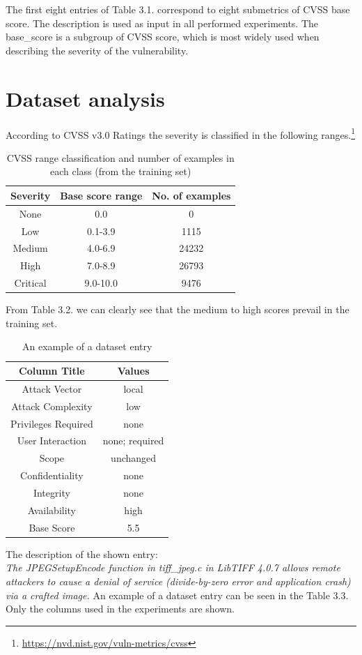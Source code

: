 \documentclass[times, utf8, zavrsni, english]{fer}
\begin{document}
\noindent The first eight entries of Table 3.1. correspond to eight submetrics of CVSS base score.
The description is used as input in all performed experiments.
The base\_score is a subgroup of CVSS score, which is most widely used when describing the severity of the vulnerability.

\section{Dataset analysis}
According to CVSS v3.0 Ratings the severity is classified in the following ranges.\footnote{\url{https://nvd.nist.gov/vuln-metrics/cvss}}
\begin{table}[h!]
	\centering
	\begin{tabular}{| c c c |} 
		\hline
		Severity & Base score range & No. of examples\\ [0.5ex] 
		\hline\hline
		
		None & 0.0 & 0  \\
		Low &  0.1-3.9 & 1115 \\
		Medium & 4.0-6.9 & 24232  \\
		High & 7.0-8.9  & 26793 \\
		Critical & 9.0-10.0 & 9476\\
		\hline
	\end{tabular}
	\caption{CVSS range classification and number of examples in each class (from the training set)}
	\label{table:2}
\end{table}

\noindent From Table 3.2. we can clearly see that the medium to high scores prevail in the training set.


\begin{table}[h!]
	\centering
	\begin{tabular}{| c | c |} 
		\hline
		Column Title & Values  \\ [0.5ex] 
		\hline\hline
		
		Attack Vector & local  \\
		Attack Complexity & low  \\
		Privileges Required & none  \\
		User Interaction & none; required \\ 
		Scope & unchanged \\ 
		Confidentiality & none  \\
		Integrity & none  \\
		Availability & high  \\
		
		\hline\hline
		
		Base Score & 5.5 \\
		\hline
	\end{tabular}
	\caption{An example of a dataset entry}
	\label{table:3}
\end{table}
\noindent The description of the shown entry: \\
\textit{The JPEGSetupEncode function in tiff\_jpeg.c in LibTIFF 4.0.7 allows remote attackers to cause a denial of service (divide-by-zero error and application crash) via a crafted image.}
An example of a dataset entry can be seen in the Table 3.3. Only the columns used in the experiments are shown. 
\end{document}
